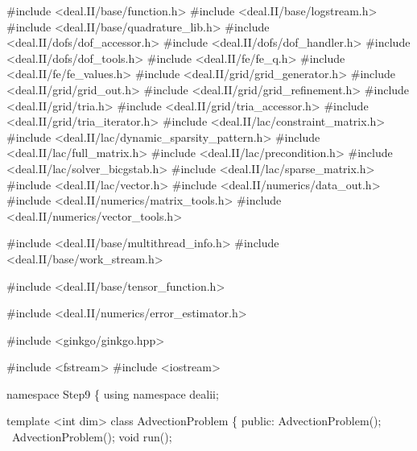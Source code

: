 \begin{DoxyCodeInclude}
\textcolor{preprocessor}{#include <deal.II/base/function.h>}
\textcolor{preprocessor}{#include <deal.II/base/logstream.h>}
\textcolor{preprocessor}{#include <deal.II/base/quadrature\_lib.h>}
\textcolor{preprocessor}{#include <deal.II/dofs/dof\_accessor.h>}
\textcolor{preprocessor}{#include <deal.II/dofs/dof\_handler.h>}
\textcolor{preprocessor}{#include <deal.II/dofs/dof\_tools.h>}
\textcolor{preprocessor}{#include <deal.II/fe/fe\_q.h>}
\textcolor{preprocessor}{#include <deal.II/fe/fe\_values.h>}
\textcolor{preprocessor}{#include <deal.II/grid/grid\_generator.h>}
\textcolor{preprocessor}{#include <deal.II/grid/grid\_out.h>}
\textcolor{preprocessor}{#include <deal.II/grid/grid\_refinement.h>}
\textcolor{preprocessor}{#include <deal.II/grid/tria.h>}
\textcolor{preprocessor}{#include <deal.II/grid/tria\_accessor.h>}
\textcolor{preprocessor}{#include <deal.II/grid/tria\_iterator.h>}
\textcolor{preprocessor}{#include <deal.II/lac/constraint\_matrix.h>}
\textcolor{preprocessor}{#include <deal.II/lac/dynamic\_sparsity\_pattern.h>}
\textcolor{preprocessor}{#include <deal.II/lac/full\_matrix.h>}
\textcolor{preprocessor}{#include <deal.II/lac/precondition.h>}
\textcolor{preprocessor}{#include <deal.II/lac/solver\_bicgstab.h>}
\textcolor{preprocessor}{#include <deal.II/lac/sparse\_matrix.h>}
\textcolor{preprocessor}{#include <deal.II/lac/vector.h>}
\textcolor{preprocessor}{#include <deal.II/numerics/data\_out.h>}
\textcolor{preprocessor}{#include <deal.II/numerics/matrix\_tools.h>}
\textcolor{preprocessor}{#include <deal.II/numerics/vector\_tools.h>}

\textcolor{preprocessor}{#include <deal.II/base/multithread\_info.h>}
\textcolor{preprocessor}{#include <deal.II/base/work\_stream.h>}

\textcolor{preprocessor}{#include <deal.II/base/tensor\_function.h>}

\textcolor{preprocessor}{#include <deal.II/numerics/error\_estimator.h>}

\textcolor{preprocessor}{#include <ginkgo/ginkgo.hpp>}

\textcolor{preprocessor}{#include <fstream>}
\textcolor{preprocessor}{#include <iostream>}


\textcolor{keyword}{namespace }Step9 \{
\textcolor{keyword}{using namespace }dealii;


\textcolor{keyword}{template} <\textcolor{keywordtype}{int} dim>
\textcolor{keyword}{class }AdvectionProblem \{
\textcolor{keyword}{public}:
    AdvectionProblem();
    ~AdvectionProblem();
    \textcolor{keywordtype}{void} run();


\end{DoxyCodeInclude}

